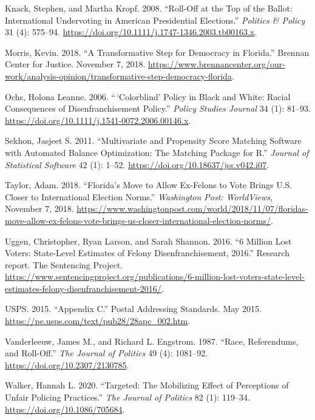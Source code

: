 \documentclass[
  12pt,
]{article}
\newlength{\cslhangindent}
\newenvironment{cslreferences}%
  {\setlength{\parindent}{0pt}%
  \everypar{\setlength{\hangindent}{\cslhangindent}}\ignorespaces}%
  {\par}
\begin{document}
\begin{cslreferences}
\leavevmode\hypertarget{ref-Knack2008}{}%
Knack, Stephen, and Martha Kropf. 2008. ``Roll-Off at the Top of the Ballot: International Undervoting in American Presidential Elections.'' \emph{Politics \& Policy} 31 (4): 575--94. \url{https://doi.org/10.1111/j.1747-1346.2003.tb00163.x}.

\leavevmode\hypertarget{ref-Morris2018}{}%
Morris, Kevin. 2018. ``A Transformative Step for Democracy in Florida.'' Brennan Center for Justice. November 7, 2018. \url{https://www.brennancenter.org/our-work/analysis-opinion/transformative-step-democracy-florida}.

\leavevmode\hypertarget{ref-Ochs2006}{}%
Ochs, Holona Leanne. 2006. ``\,`Colorblind' Policy in Black and White: Racial Consequences of Disenfranchisement Policy.'' \emph{Policy Studies Journal} 34 (1): 81--93. \url{https://doi.org/10.1111/j.1541-0072.2006.00146.x}.

\leavevmode\hypertarget{ref-Sekhon2011}{}%
Sekhon, Jasjeet S. 2011. ``Multivariate and Propensity Score Matching Software with Automated Balance Optimization: The Matching Package for R.'' \emph{Journal of Statistical Software} 42 (1): 1--52. \url{https://doi.org/10.18637/jss.v042.i07}.

\leavevmode\hypertarget{ref-Taylor2018}{}%
Taylor, Adam. 2018. ``Florida's Move to Allow Ex-Felons to Vote Brings U.S. Closer to International Election Norms.'' \emph{Washington Post: WorldViews}, November 7, 2018. \url{https://www.washingtonpost.com/world/2018/11/07/floridas-move-allow-ex-felons-vote-brings-us-closer-international-election-norms/}.

\leavevmode\hypertarget{ref-sentencing_2016}{}%
Uggen, Christopher, Ryan Larson, and Sarah Shannon. 2016. ``6 Million Lost Voters: State-Level Estimates of Felony Disenfranchisement, 2016.'' Research report. The Sentencing Project. \url{https://www.sentencingproject.org/publications/6-million-lost-voters-state-level-estimates-felony-disenfranchisement-2016/}.

\leavevmode\hypertarget{ref-USPS2015}{}%
USPS. 2015. ``Appendix C.'' Postal Addressing Standards. May 2015. \url{https://pe.usps.com/text/pub28/28apc_002.htm}.

\leavevmode\hypertarget{ref-Vanderleeuw1987}{}%
Vanderleeuw, James M., and Richard L. Engstrom. 1987. ``Race, Referendums, and Roll-Off.'' \emph{The Journal of Politics} 49 (4): 1081--92. \url{https://doi.org/10.2307/2130785}.

\leavevmode\hypertarget{ref-Walker2020}{}%
Walker, Hannah L. 2020. ``Targeted: The Mobilizing Effect of Perceptions of Unfair Policing Practices.'' \emph{The Journal of Politics} 82 (1): 119--34. \url{https://doi.org/10.1086/705684}.


\end{cslreferences}
\end{document}
